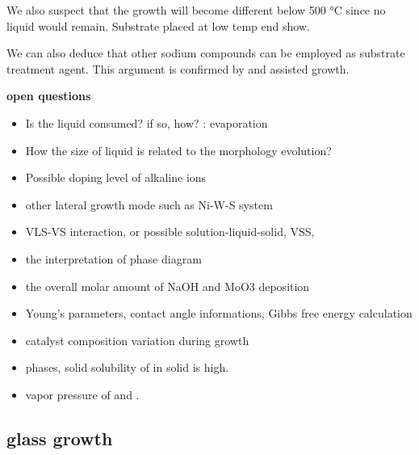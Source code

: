 We also suspect that the growth will become different below 500 \si{\degreeCelsius} since no liquid would remain. Substrate placed at low temp end show.

We can also deduce that other sodium compounds can be employed as substrate treatment agent. This argument is confirmed by  and  assisted growth.


\textbf{open questions}
\begin{itemize}
\item Is the liquid consumed? if so, how? : evaporation
\item How the size of liquid is related to the morphology evolution?
\item Possible doping level of alkaline ions
\item other lateral growth mode such as Ni-W-S system
\item VLS-VS interaction, or possible solution-liquid-solid, VSS,
\item the interpretation of phase diagram
\item the overall molar amount of NaOH and MoO3 deposition
\item Young's parameters, contact angle informations, Gibbs free energy calculation
\item catalyst composition variation during growth
\item {} phases, solid solubility of  in solid  is high.
\item vapor pressure of  and .
\end{itemize}




\subsection{glass growth}


